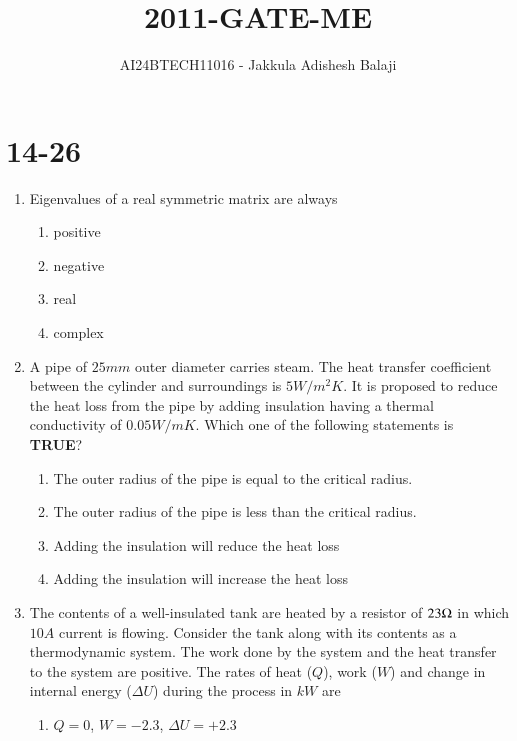 \documentclass[journal]{IEEEtran}
\begin{document}

\title{2011-GATE-ME}
\author{AI24BTECH11016 - Jakkula Adishesh Balaji}
{\let\newpage\relax\maketitle}

\renewcommand{\thefigure}{\theenumi}
\renewcommand{\thetable}{\theenumi}
\setlength{\intextsep}{10pt} %
\section{14-26}
\begin{enumerate}
	\item
	Eigenvalues of a real symmetric matrix are always
		\begin{enumerate}
			\item positive
			\item negative
			\item real
			\item complex
		\end{enumerate}
	\item
	A pipe of $25 mm$ outer diameter carries steam. The heat transfer coefficient between the cylinder and surroundings is $5 W/m^{2}K$. It is proposed to reduce the heat loss from the pipe by adding insulation having a thermal conductivity of $0.05 W/mK$. Which one of the following statements is \textbf{TRUE}?
		\begin{enumerate}
			\item The outer radius of the pipe is equal to the critical radius.
			\item The outer radius of the pipe is less than the critical radius.
			\item Adding the insulation will reduce the heat loss
			\item Adding the insulation will increase the heat loss
		\end{enumerate}
	\item
	The contents of a well-insulated tank are heated by a resistor of $23 \ohm$ in which $10 A$ current is flowing. Consider the tank along with its contents as a thermodynamic system. The work done by the system and the heat transfer to the system are positive. The rates of heat ($Q$), work ($W$) and change in internal energy ($\Delta U$) during the process in $kW$ are
		\begin{enumerate}	
			\item $Q=0$, $W=-2.3$, $\Delta U = +2.3$

\end{enumerate}
\end{enumerate}
\end{document}
